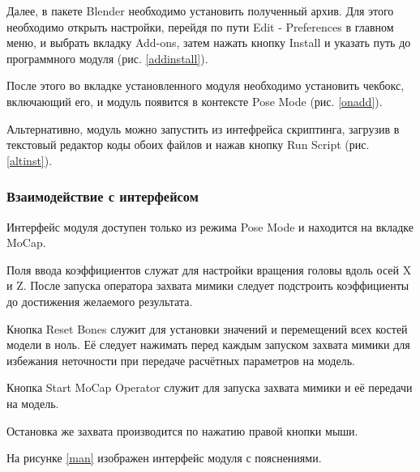 
Далее, в пакете Blender необходимо установить полученный архив. Для этого необходимо открыть настройки, перейдя по пути Edit - Preferences в главном меню, и выбрать вкладку Add-ons, затем нажать кнопку Install и указать путь до программного модуля (рис. \ref{addinstall}).


После этого во вкладке установленного модуля необходимо установить чекбокс, включающий его, и модуль появится в контексте Pose Mode (рис. \ref{onadd}).


Альтернативно, модуль можно запустить из интефрейса скриптинга, загрузив в текстовый редактор коды обоих файлов и нажав кнопку Run Script (рис. \ref{altinst}).


\subsubsection {Взаимодействие с интерфейсом}

Интерфейс модуля доступен только из режима Pose Mode и находится на вкладке MoCap.

Поля ввода коэффициентов служат для настройки вращения головы вдоль осей X и Z. После запуска оператора захвата мимики следует подстроить коэффициенты до достижения желаемого результата.

Кнопка Reset Bones служит для установки значений и перемещений всех костей модели в ноль. Её следует нажимать перед каждым запуском захвата мимики для избежания неточности при передаче расчётных параметров на модель. 

Кнопка Start MoCap Operator служит для запуска захвата мимики и её передачи на модель.

Остановка же захвата производится по нажатию правой кнопки мыши.

На рисунке \ref{man} изображен интерфейс модуля с пояснениями.


\clearpage
